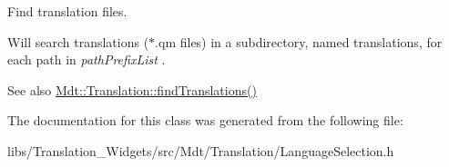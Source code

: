 Find translation files. 

Will search translations ($\ast$.qm files) in a subdirectory, named translations, for each path in {\itshape path\+Prefix\+List} .

\begin{DoxySeeAlso}{See also}
\hyperlink{namespace_mdt_1_1_translation_a4267ecfaee1a925cd57515ed7fece047}{Mdt\+::\+Translation\+::find\+Translations()} 
\end{DoxySeeAlso}


The documentation for this class was generated from the following file\+:\begin{DoxyCompactItemize}
\item 
libs/\+Translation\+\_\+\+Widgets/src/\+Mdt/\+Translation/Language\+Selection.\+h\end{DoxyCompactItemize}
